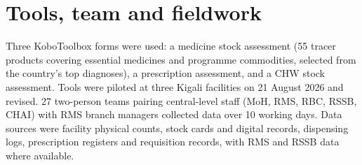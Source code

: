 \documentclass[10pt,a4paper]{report}
\begin{document}
\section{Tools, team and fieldwork}
Three KoboToolbox forms were used: a medicine stock assessment (55 tracer products covering essential medicines and programme commodities, selected from the country's top diagnoses), a prescription assessment, and a CHW stock assessment. Tools were piloted at three Kigali facilities on 21 August 2026 and revised. 27 two-person teams pairing central-level staff (MoH, RMS, RBC, RSSB, CHAI) with RMS branch managers collected data over 10 working days. Data sources were facility physical counts, stock cards and digital records, dispensing logs, prescription registers and requisition records, with RMS and RSSB data where available.
\end{document}
